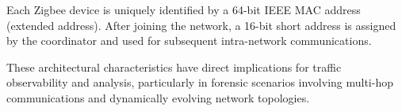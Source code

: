 Each Zigbee device is uniquely identified by a 64-bit IEEE MAC address (extended address). After joining the network, a 16-bit short address is assigned by the coordinator and used for subsequent intra-network communications.

These architectural characteristics have direct implications for traffic observability and analysis, particularly in forensic scenarios involving multi-hop communications and dynamically evolving network topologies.

